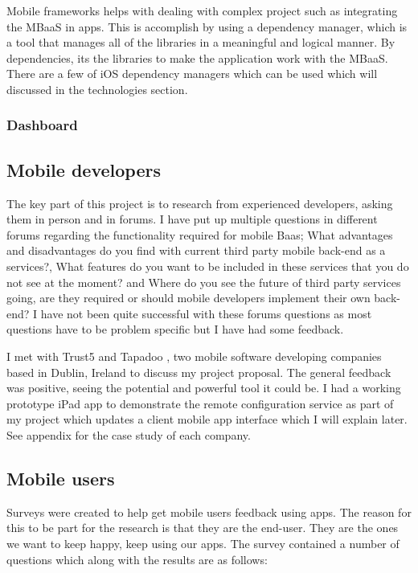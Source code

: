 Mobile frameworks helps with dealing with complex project such as integrating the MBaaS in apps. This is accomplish by using a dependency manager, which is a tool that manages all of the libraries in a meaningful and logical manner. By dependencies, its the libraries to make the application work with the MBaaS. There are a few of iOS dependency managers which can be used which will discussed in the technologies section.

\subsubsection{Dashboard}

\subsection{Mobile developers}

The key part of this project is to research from experienced developers, asking them in person and in forums. I have put up multiple questions in different forums regarding the functionality required for mobile Baas; What advantages and disadvantages do you find with current third party mobile back-end as a services?, What features do you want to be included in these services that you do not see at the moment? and Where do you see the future of third party services going, are they required or should mobile developers implement their own back-end? I have not been quite successful with these forums questions as most questions have to be problem specific but I have had some feedback.

I met with Trust5 \cite{trust5} and Tapadoo \cite{tapadoo}, two mobile software developing companies based in Dublin, Ireland to discuss my project proposal. The general feedback was positive, seeing the potential and powerful tool it could be. I had a working prototype iPad app  to demonstrate the remote configuration service as part of my project which updates a client mobile app interface which I will explain later. See appendix for the case study of each company.

\subsection{Mobile users}

Surveys were created to help get mobile users feedback using apps. The reason for this to be part for the research is that they are the end-user. They are the ones we want to keep happy, keep using our apps. The survey contained a number of questions which along with the results are as follows:

